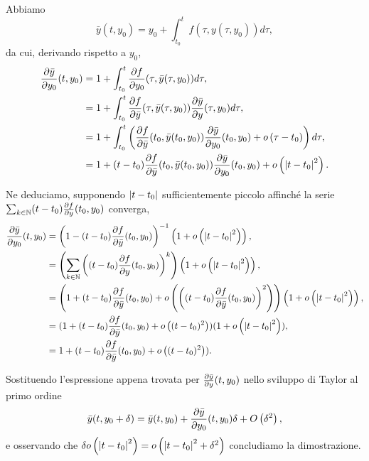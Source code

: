 \Proof Abbiamo
\[
	\bar{y}(t,y_0) = y_0 + \int_{t_0}^t f(\tau,y(\tau,y_0)) d\tau,	
\]
da cui, derivando rispetto a $y_0$,
\begin{align*}
	\frac{\partial \bar{y}}{\partial y_0}(t,y_0)
	&= 1 + \int_{t_0}^t \frac{\partial f}{\partial y_0} (\tau,\bar{y}(\tau,y_0)) d\tau,\\
	&= 1 + \int_{t_0}^t \frac{\partial f}{\partial \bar{y}} (\tau,\bar{y}(\tau,y_0)) \frac{\partial \bar{y}}{\partial y}(\tau,y_0) d\tau,\\
	&= 1 + \int_{t_0}^t \left (\frac{\partial f}{\partial \bar{y}} (t_0,\bar{y}(t_0,y_0)) \frac{\partial \bar{y}}{\partial y_0}(t_0,y_0) + o \left ( \tau - t_0 \right ) \right ) d\tau,\\
	&= 1 + (t - t_0)\frac{\partial f}{\partial \bar{y}} (t_0,\bar{y}(t_0,y_0)) \frac{\partial \bar{y}}{\partial y_0}(t_0,y_0) + o \left ( \left \lvert t - t_0 \right \rvert^2 \right ).
\end{align*}
\par Ne deduciamo, supponendo $\left \lvert t - t_0 \right \rvert$ sufficientemente piccolo affinch\'e la serie $\sum_{k \in \mathbb{N}}(t - t_0)\frac{\partial f}{\partial y}(t_0,y_0)$ converga,
\begin{align*}
	\frac{\partial \bar{y}}{\partial y_0}(t,y_0)
	&= \left (1 - (t - t_0)\frac{\partial f}{\partial \bar{y}}(t_0,y_0) \right )^{-1} \left ( 1 + o \left ( \left \lvert t - t_0 \right \rvert^2 \right ) \right ),\\
	&= \left ( \sum_{k \in \mathbb{N}}\left ( (t - t_0)\frac{\partial f}{\partial y}(t_0,y_0) \right )^k \right ) \left (1 + o \left ( \left \lvert t - t_0 \right \rvert^2 \right ) \right ),\\
	&= \left ( 1 + (t - t_0)\frac{\partial f}{\partial \bar{y}}(t_0,y_0) + o \left ( \left ( (t - t_0)\frac{\partial f}{\partial \bar{y}}(t_0,y_0) \right )^2 \right ) \right ) \left ( 1 + o \left ( \left \lvert t - t_0 \right \rvert^2 \right ) \right ),\\
	&= (1 + (t - t_0)\frac{\partial f}{\partial \bar{y}}(t_0,y_0) + o \left ( (t - t_0)^2 \right ))(1 + o \left ( \left \lvert t - t_0 \right \rvert^2 \right )),\\
	&= 1 + (t - t_0)\frac{\partial f}{\partial \bar{y}}(t_0,y_0) + o \left ( (t - t_0)^2 \right )).\\
\end{align*}
\par Sostituendo l'espressione appena trovata per $\frac{\partial \bar{y}}{\partial y}(t,y_0)$ nello sviluppo di Taylor al primo ordine
\[
	\bar{y}(t,y_0 + \Perturbation) = \bar{y}(t,y_0) + \PartialDerivative{\bar{y}}{y_0}(t,y_0) \Perturbation + \BigO{\Perturbation^2},
\]
e osservando che $\IsLittleo{\delta\Littleo{\AbsoluteValue{t - t_0}^2}}{\AbsoluteValue{t - t_0}^2 + \Perturbation^2}$ concludiamo la dimostrazione. \EndProof
